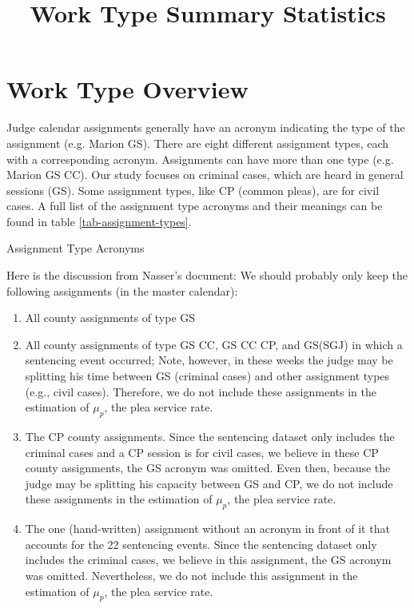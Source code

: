 \documentclass[11pt]{article}
\title{Work Type Summary Statistics}
\begin{document}
\maketitle

\section{Work Type Overview}
  Judge calendar assignments generally have an acronym indicating the type of the assignment (e.g. Marion GS). There are eight different assignment types, each with a corresponding acronym. Assignments can have more than one type (e.g. Marion GS CC). Our study focuses on criminal cases, which are heard in general sessions (GS). Some assignment types, like CP (common pleas), are for civil cases. A full list of the assignment type acronyms and their meanings can be found in table \ref{tab-assignment-types}.

  \begin{table}[H]
    \centering
    \caption{Assignment Type Acronyms}
    \label{tab-assignment-types}
    
  \end{table}

  Here is the discussion from Nasser's document: We should probably only keep the following assignments (in the master calendar):
  \begin{enumerate}
    \vspace{-2mm}
    \item All county assignments of type GS
    \item All county assignments of type GS CC, GS CC CP, and GS(SGJ) in which a sentencing event occurred;  Note, however, in these weeks the judge may be splitting his time between GS (criminal cases) and other assignment types (e.g., civil cases). Therefore, we do not include these assignments in the estimation of $\mu_p$, the plea service rate.
    \item The CP county assignments. Since the sentencing dataset only includes the criminal cases and a CP session is for civil cases, we believe in these CP county assignments, the GS acronym was omitted. Even then, because the judge may be splitting his capacity between GS and CP, we do not include these assignments in the estimation of $\mu_p$, the plea service rate.
    \item The one (hand-written) assignment without an acronym in front of it that accounts for the 22 sentencing events. Since the sentencing dataset only includes the criminal cases, we believe in this assignment, the GS acronym was omitted. Nevertheless, we do not include this assignment in the estimation of $\mu_p$, the plea service rate.
  \end{enumerate}
\end{document}
